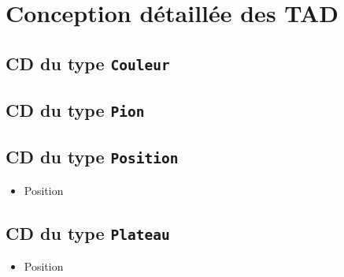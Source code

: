 
\chapter{Conception détaillée des TAD}

\section{CD du type \tt{Couleur}}
\begin{itemize}
\end{itemize}

\section{CD du type \tt{Pion}}
\begin{itemize}
\end{itemize}

\section{CD du type \tt{Position}}
\begin{itemize}
\item
\begin{algorithme}
\begin{enregistrement}{Position}
\end{enregistrement}
\end{algorithme}
\end{itemize}

\section{CD du type \tt{Plateau}}
\begin{itemize}
\item
\begin{algorithme}
\begin{enregistrement}{Position}
\end{enregistrement}
\end{algorithme}
\end{itemize}

